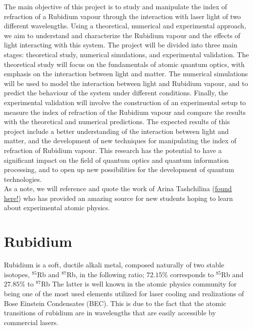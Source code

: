 \documentclass[10pt]{article}
\begin{document}
\noindent The main objective of this project is to study and manipulate the index of refraction of a Rubidium vapour through the interaction with laser light of two different wavelengths. Using a theoretical, numerical and experimental approach, we aim to understand and characterize the Rubidium vapour and the effects of light interacting with this system. The project will be divided into three main stages: theoretical study, numerical simulations, and experimental validation. The theoretical study will focus on the fundamentals of atomic quantum optics, with emphasis on the interaction between light and matter. The numerical simulations will be used to model the interaction between light and Rubidium vapour, and to predict the behaviour of the system under different conditions. Finally, the experimental validation will involve the construction of an experimental setup to measure the index of refraction of the Rubidium vapour and compare the results with the theoretical and numerical predictions. The expected results of this project include a better understanding of the interaction between light and matter, and the development of new techniques for manipulating the index of refraction of Rubidium vapour. This research has the potential to have a significant impact on the field of quantum optics and quantum information processing, and to open up new possibilities for the development of quantum technologies.\\

\noindent As a note, we will reference and quote the work of Arina Tashchilina (\href{https://arinainphysics.com/}{found here!}) who has provided an amazing source for new students hoping to learn about experimental atomic physics. 



\newpage
\section*{Rubidium}
Rubidium is a soft, ductile alkali metal, composed naturally of two stable isotopes, $^{85}$Rb and $^{87}$Rb, in the following ratio; $72.15\%$ corresponds to  $^{85}$Rb and $27.85\%$ to  $^{87}$Rb 
The latter is well known in the atomic physics community for being one of the most used elements utilized for laser cooling and realizations of Bose Einstein Condensates (BEC). This is due to the fact that the atomic transitions of rubidium are in wavelengths that are easily accessible by commercial lasers.
\end{document}
